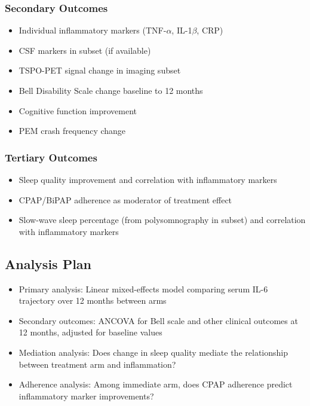 \subsubsection{Secondary Outcomes}
\begin{itemize}
    \item Individual inflammatory markers (TNF-$\alpha$, IL-1$\beta$, CRP)
    \item CSF markers in subset (if available)
    \item TSPO-PET signal change in imaging subset
    \item Bell Disability Scale change baseline to 12 months
    \item Cognitive function improvement
    \item PEM crash frequency change
\end{itemize}

\subsubsection{Tertiary Outcomes}
\begin{itemize}
    \item Sleep quality improvement and correlation with inflammatory markers
    \item CPAP/BiPAP adherence as moderator of treatment effect
    \item Slow-wave sleep percentage (from polysomnography in subset) and correlation with inflammatory markers
\end{itemize}

\subsection{Analysis Plan}

\begin{itemize}
    \item Primary analysis: Linear mixed-effects model comparing serum IL-6 trajectory over 12 months between arms
    \item Secondary outcomes: ANCOVA for Bell scale and other clinical outcomes at 12 months, adjusted for baseline values
    \item Mediation analysis: Does change in sleep quality mediate the relationship between treatment arm and inflammation?
    \item Adherence analysis: Among immediate arm, does CPAP adherence predict inflammatory marker improvements?
\end{itemize}

